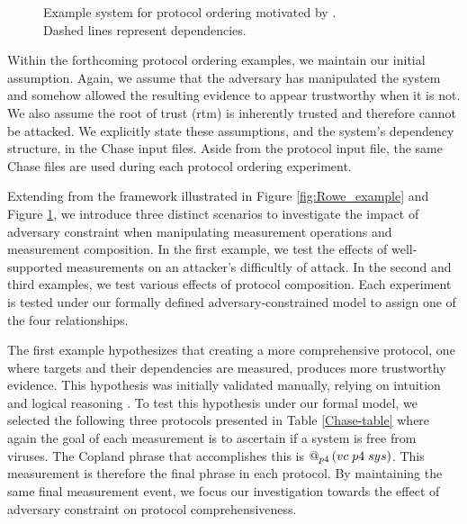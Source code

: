 \documentclass[runningheads]{llncs}
\theoremstyle{definition}
\begin{document}

\begin{figure}[htbp]
    \centering
    
    \captionsetup{justification=centering,margin=1cm}
    \caption[Example system for protocol ordering]{Example system for protocol ordering motivated by \cite{Rowe:2016:Confining}.\\ Dashed lines represent dependencies. }
    \label{fig:ord-system}
\end{figure}

Within the forthcoming protocol ordering examples, we maintain our initial assumption. Again, we assume that the adversary has manipulated the system and somehow allowed the resulting evidence to appear trustworthy when it is not. We also assume the root of trust (rtm) is inherently trusted and therefore cannot be attacked. We explicitly state these assumptions, and the system's dependency structure, in the Chase input files. Aside from the protocol input file, the same Chase files are used during each protocol ordering experiment. 

Extending from the framework illustrated in Figure \ref{fig:Rowe_example} and Figure \ref{fig:ord-system}, we introduce three distinct scenarios to investigate the impact of adversary constraint when manipulating measurement operations and measurement composition. In the first example, we test the effects of well-supported measurements on an attacker's difficultly of attack. In the second and third examples, we test various effects of protocol composition. Each experiment is tested under our formally defined adversary-constrained model to assign one of the four relationships.

The first example hypothesizes that creating a more comprehensive protocol, one where targets and their dependencies are measured, produces more trustworthy evidence. This hypothesis was initially validated manually, relying on intuition and logical reasoning \cite{Rowe:2016:Confining}. To test this hypothesis under our formal model, we selected the following three protocols presented in Table \ref{Chase-table} where again the goal of each measurement is to ascertain if a system is free from viruses. The Copland phrase that accomplishes this is $\mathop{@_{p4}}{(vc\; p4\; sys)}$. This measurement is therefore the final phrase in each protocol. By maintaining the same final measurement event, we focus our investigation towards the effect of adversary constraint on protocol comprehensiveness.
\end{document}
